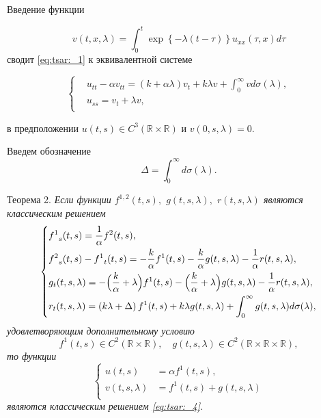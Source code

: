 Введение функции

\begin{equation}
v(t,x,\lambda) = \int^t_0 \exp \left\{ -\lambda (t-\tau) \right\} u_{xx}(\tau,x)d\tau
\label{eq:tsar:_2}
\end{equation}
сводит \eqref{eq:tsar:_1} к эквивалентной системе

\begin{equation}
\left\{
\begin{aligned}
&u_{tt} - \alpha v_{tt} = \left( k + \alpha \lambda \right) v_t + k \lambda v + \int_0^{\infty} v d\sigma(\lambda),\\
&u_{ss} = v_t + \lambda v,\\
\end{aligned}
\right.
\label{eq:tsar:_4}
\end{equation}

в предположении $u(t,s) \in C^3 ({\mathbb R \times \mathbb R })$ и 
$v(0,s,\lambda)=0.$

Введем обозначение $$\Delta = \int_0^{\infty} d\sigma(\lambda).$$ 

\smallskip
\hypertarget{tsar:th2}{}

{\small \sc Теорема 2.} \it 
Если функции ${f^{1,2}}(t,s),$  $g(t,s,\lambda),$ $r(t,s,\lambda)$ 
являются классическим решением
\begin{equation}
\left\{
\begin{aligned}
&{f^1}_s(t,s) = \frac{1}{\alpha} {f^2}(t,s),\\
&{f^2}_s(t,s) - {f^1}_t(t,s)= 
							- \frac{k}{\alpha} {f^1}(t,s)
							- \frac{k}{\alpha} g(t,s,\lambda)
							- \frac{1}{\alpha} r(t,s,\lambda), \\
&g_t(t,s,\lambda) = - \Bigl( \frac{k}{\alpha} + \lambda \Bigr) {f^1}(t,s)
				- \Bigl( \frac{k}{\alpha} + \lambda \Bigr) g(t,s,\lambda)
				- \frac{1}{\alpha} r(t,s,\lambda)
				,\\
&r_t(t,s,\lambda) = \left( k \lambda + \Delta \right) {f^1}(t,s)
				+ k \lambda g(t,s,\lambda)
				+ \int_0^{\infty} g(t,s,\lambda) d\sigma(\lambda)
				,\\
\end{aligned}
\right. \label{eq:tsar:_6_5}
\end{equation}
удовлетворяющим дополнительному условию
\begin{equation}
{f^1}(t,s) \in C^2({\mathbb R \times \mathbb R }), \quad 
g(t,s,\lambda) \in C^2({\mathbb R \times \mathbb R \times \mathbb R}),
\label{eq:tsar:_6_5_usl}
\end{equation}
то функции
\begin{equation}
\left\{
\begin{aligned}
u(t,s) &= \alpha {f^{1}}(t,s) ,\\
v(t,s,\lambda) &= {f^{1}}(t,s) + g(t,s,\lambda) \\
\end{aligned}
\right. \label{eq:tsar:_5_5}
\end{equation}
являются классическим решением \rm  \eqref{eq:tsar:_4}. \it

